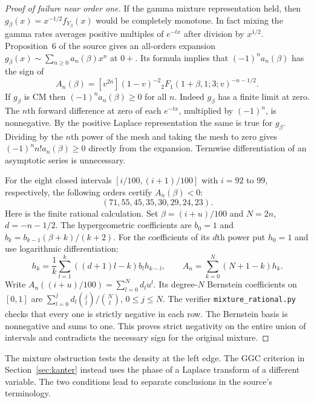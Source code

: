 \documentclass[11pt,a4paper]{article}
\numberwithin{equation}{section}
\begin{document}
\begin{proof}[Proof of failure near order one]
If the gamma mixture representation held, then $g_\beta(x)=
x^{-1/2} f_{Y_\beta}(x)$ would be completely monotone. In fact mixing
the gamma rates averages positive multiples of $e^{-tx}$ after division
by $x^{1/2}$. Proposition~6 of the source gives an all-orders expansion
$g_\beta(x)\sim\sum_{n\ge0}a_n(\beta)x^n$ at $0+$. Its formula implies
that $(-1)^n a_n(\beta)$ has the sign of
\[
 A_n(\beta)=[v^{2n}](1-v)^{-2}
   {}_2F_1(1+\beta,1;3;v)^{-n-1/2}.
\]
If $g_\beta$ is CM then $(-1)^n a_n(\beta)\ge0$ for all $n$.
Indeed $g_\beta$ has a finite limit at zero. The $n$th forward
difference at zero of each $e^{-t x}$, multiplied by $(-1)^n$, is
nonnegative. By the positive Laplace representation the same is true
for $g_\beta$. Dividing by the $n$th power of the mesh and taking
the mesh to zero gives $(-1)^n n!a_n(\beta)\ge0$ directly from
the expansion. Termwise differentiation of an asymptotic series is
unnecessary.

For the eight closed intervals $[i/100,(i+1)/100]$ with $i=92$ to
$99$, respectively, the following orders certify $A_n(\beta)<0$:
\[
  (71,55,45,35,30,29,24,23).
\]
Here is the finite rational calculation. Set $\beta=(i+u)/100$ and
$N=2n$, $d=-n-1/2$. The hypergeometric coefficients are
$b_0=1$ and $b_k=b_{k-1}(\beta+k)/(k+2)$. For the coefficients
of its $d$th power put $h_0=1$ and use logarithmic differentiation:
\[
 h_k=\frac1k\sum_{l=1}^k ((d+1)l-k)b_l h_{k-l},\qquad
 A_n=\sum_{k=0}^N(N+1-k)h_k.
\]
Write $A_n((i+u)/100)=\sum_{l=0}^N d_l u^l$. Its degree-$N$
Bernstein coefficients on $[0,1]$ are
$\sum_{l=0}^j d_l\binom jl/\binom Nl$, $0\le j\le N$.
The verifier \texttt{mixture\_rational.py} checks that every one
is strictly negative in each row. The Bernstein basis is nonnegative
and sums to one. This proves strict negativity on the entire union of
intervals and contradicts the necessary sign for the original mixture.
\end{proof}
The mixture obstruction tests the density at the left edge. The GGC
criterion in Section~\ref{sec:kanter} instead uses the phase of a
Laplace transform of a different variable. The two conditions lead
to separate conclusions in the source's terminology.
\end{document}
